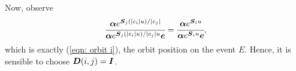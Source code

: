Now, observe 
\[\cfrac{\boldsymbol \alpha e^{\boldsymbol S_j (|c_i|u)/|c_j|}}{\boldsymbol \alpha e^{\boldsymbol S_j (|c_i|u)/|c_j| u}\boldsymbol e} = \cfrac{\boldsymbol \alpha e^{\boldsymbol S_iu}}{\boldsymbol \alpha e^{\boldsymbol S_i u}\boldsymbol e},\] 
which is exactly (\ref{eqn: orbit i}), the orbit position on the event \(E\). Hence, it is sensible to choose \(\boldsymbol D(i,j)=\boldsymbol I\). 




